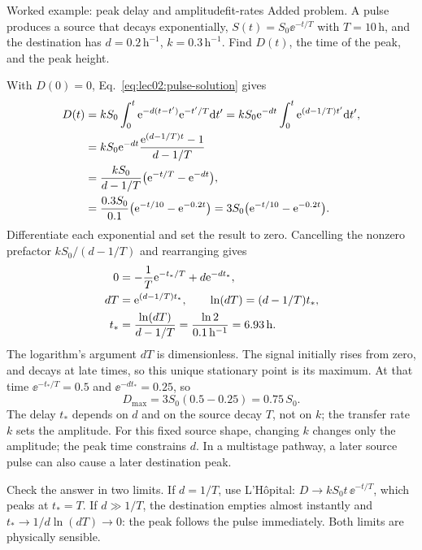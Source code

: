 \begin{example}[unbreakable,fontupper=\small]{Worked example: peak delay and amplitude}{fit-rates}
Added problem. A pulse produces a source that decays exponentially, $S(t)=S_0\ee^{-t/T}$ with $T=10\,\mathrm{h}$, and the destination has $d=0.2\,\mathrm{h}^{-1}$, $k=0.3\,\mathrm{h}^{-1}$. Find $D(t)$, the time of the peak, and the peak height.

With $D(0)=0$, Eq.~\eqref{eq:lec02:pulse-solution} gives
\begin{align}
D(t)&=kS_0\int_0^t\mathrm{e}^{-d(t-t')}\mathrm{e}^{-t'/T}\mathrm{d} t'
 =kS_0\mathrm{e}^{-dt}\int_0^t\mathrm{e}^{(d-1/T)t'}\mathrm{d} t',\notag\\
&=kS_0\mathrm{e}^{-dt}\frac{\mathrm{e}^{(d-1/T)t}-1}{d-1/T}\notag\\
&=\frac{kS_0}{d-1/T}\bigl(\mathrm{e}^{-t/T}-\mathrm{e}^{-dt}\bigr),\label{eq:lec02:worked-D}\\
&=\frac{0.3S_0}{0.1}\bigl(\mathrm{e}^{-t/10}-\mathrm{e}^{-0.2t}\bigr)
=3S_0\bigl(\mathrm{e}^{-t/10}-\mathrm{e}^{-0.2t}\bigr).\label{eq:lec02:worked-numbers}
\end{align}
Differentiate each exponential and set the result to zero. Cancelling the nonzero prefactor $kS_0/(d-1/T)$ and rearranging gives
\begin{align}
0&=-\frac1T\mathrm{e}^{-t_*/T}+d\mathrm{e}^{-dt_*},\notag\\
dT&=\mathrm{e}^{(d-1/T)t_*},\qquad
\ln(dT)=(d-1/T)t_*,\notag\\
t_*&=\frac{\ln(dT)}{d-1/T}=\frac{\ln2}{0.1\,\mathrm{h}^{-1}}=6.93\,\mathrm{h}.\label{eq:lec02:peak-time}
\end{align}
The logarithm's argument $dT$ is dimensionless. The signal initially rises from zero, and decays at late times, so this unique stationary point is its maximum.
At that time $\ee^{-t_*/T}=0.5$ and $\ee^{-dt_*}=0.25$, so
\begin{equation}\label{eq:lec02:peak-height}
D_{\max}=3S_0(0.5-0.25)=0.75\,S_0.
\end{equation}
The delay $t_*$ depends on $d$ and on the source decay $T$, not on $k$; the transfer rate $k$ sets the amplitude. For this fixed source shape, changing $k$ changes only the amplitude; the peak time constrains $d$. In a multistage pathway, a later source pulse can also cause a later destination peak.
\end{example}

\begin{remark}
Check the answer in two limits. If $d=1/T$, use L'H\^opital: $D\to kS_0t\,\ee^{-t/T}$, which peaks at $t_*=T$. If $d\gg1/T$, the destination empties almost instantly and $t_*\to 1/d\ln(dT)\to0$: the peak follows the pulse immediately. Both limits are physically sensible.
\end{remark}

